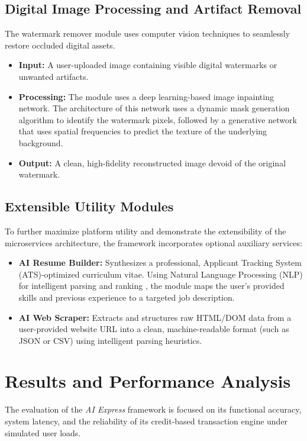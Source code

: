 \documentclass[conference]{IEEEtran}
\begin{document}
\subsection{Digital Image Processing and Artifact Removal}
The watermark remover module uses computer vision techniques to seamlessly restore occluded digital assets.
\begin{itemize}
    \item \textbf{Input:} A user-uploaded image containing visible digital watermarks or unwanted artifacts.
    \item \textbf{Processing:} The module uses a deep learning-based image inpainting network. The architecture of this network uses a dynamic mask generation algorithm to identify the watermark pixels, followed by a generative network that uses spatial frequencies to predict the texture of the underlying background.
    \item \textbf{Output:} A clean, high-fidelity reconstructed image devoid of the original watermark.
\end{itemize}

\subsection{Extensible Utility Modules}
To further maximize platform utility and demonstrate the extensibility of the microservices architecture, the framework incorporates optional auxiliary services:
\begin{itemize}
    \item \textbf{AI Resume Builder:} Synthesizes a professional, Applicant Tracking System (ATS)-optimized curriculum vitae. Using Natural Language Processing (NLP) for intelligent parsing and ranking \cite{resume2024nlp}, the module maps the user's provided skills and previous experience to a targeted job description.
    \item \textbf{AI Web Scraper:} Extracts and structures raw HTML/DOM data from a user-provided website URL into a clean, machine-readable format (such as JSON or CSV) using intelligent parsing heuristics.
\end{itemize}

\section{Results and Performance Analysis}
The evaluation of the \textit{AI Express} framework is focused on its functional accuracy, system latency, and the reliability of its credit-based transaction engine under simulated user loads.
\end{document}
